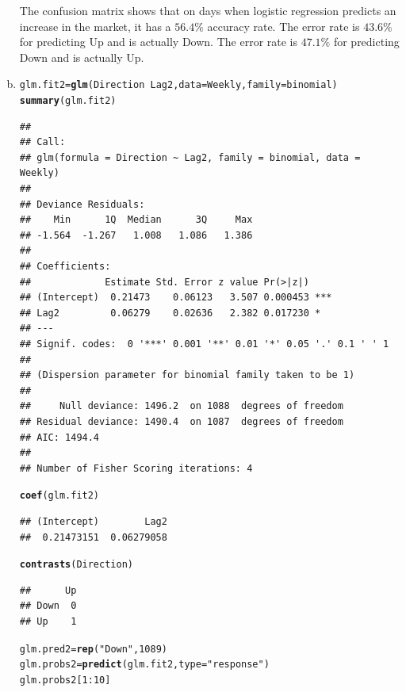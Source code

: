 \documentclass{article}\usepackage[]{graphicx}\usepackage[]{color}
\makeatletter
\newcommand{\hlnum}[1]{\textcolor[rgb]{0.686,0.059,0.569}{#1}}%
\newcommand{\hlstr}[1]{\textcolor[rgb]{0.192,0.494,0.8}{#1}}%
\newcommand{\hlopt}[1]{\textcolor[rgb]{0,0,0}{#1}}%
\newcommand{\hlstd}[1]{\textcolor[rgb]{0.345,0.345,0.345}{#1}}%
\newcommand{\hlkwb}[1]{\textcolor[rgb]{0.69,0.353,0.396}{#1}}%
\newcommand{\hlkwc}[1]{\textcolor[rgb]{0.333,0.667,0.333}{#1}}%
\newcommand{\hlkwd}[1]{\textcolor[rgb]{0.737,0.353,0.396}{\textbf{#1}}}%
\newenvironment{kframe}{%
 \def\at@end@of@kframe{}%
 \ifinner\ifhmode%
  \def\at@end@of@kframe{\end{minipage}}%
  \begin{minipage}{\columnwidth}%
 \fi\fi%
 \def\FrameCommand##1{\hskip\@totalleftmargin \hskip-\fboxsep
 \colorbox{shadecolor}{##1}\hskip-\fboxsep
     \hskip-\linewidth \hskip-\@totalleftmargin \hskip\columnwidth}%
 \MakeFramed {\advance\hsize-\width
   \@totalleftmargin\z@ \linewidth\hsize
   \@setminipage}}%
 {\par\unskip\endMakeFramed%
 \at@end@of@kframe}
\newenvironment{knitrout}{}{} %
\makeatother
\begin{document}
\begin{enumerate}[(a)]
The confusion matrix shows that on days when logistic regression predicts an increase in the market, it has a $56.4\%$ accuracy rate. The error rate is $43.6\%$ for predicting Up and is actually Down. The error rate is $47.1\%$ for predicting Down and is actually Up.

\item
\begin{knitrout}
\color{fgcolor}\begin{kframe}
\begin{alltt}
\hlstd{glm.fit2}\hlkwb{=}\hlkwd{glm}\hlstd{(Direction}\hlopt{~}\hlstd{Lag2,}\hlkwc{data}\hlstd{=Weekly,} \hlkwc{family} \hlstd{= binomial)}
\hlkwd{summary}\hlstd{(glm.fit2)}
\end{alltt}
\begin{verbatim}
## 
## Call:
## glm(formula = Direction ~ Lag2, family = binomial, data = Weekly)
## 
## Deviance Residuals: 
##    Min      1Q  Median      3Q     Max  
## -1.564  -1.267   1.008   1.086   1.386  
## 
## Coefficients:
##             Estimate Std. Error z value Pr(>|z|)    
## (Intercept)  0.21473    0.06123   3.507 0.000453 ***
## Lag2         0.06279    0.02636   2.382 0.017230 *  
## ---
## Signif. codes:  0 '***' 0.001 '**' 0.01 '*' 0.05 '.' 0.1 ' ' 1
## 
## (Dispersion parameter for binomial family taken to be 1)
## 
##     Null deviance: 1496.2  on 1088  degrees of freedom
## Residual deviance: 1490.4  on 1087  degrees of freedom
## AIC: 1494.4
## 
## Number of Fisher Scoring iterations: 4
\end{verbatim}
\begin{alltt}
\hlkwd{coef}\hlstd{(glm.fit2)}
\end{alltt}
\begin{verbatim}
## (Intercept)        Lag2 
##  0.21473151  0.06279058
\end{verbatim}
\begin{alltt}
\hlkwd{contrasts}\hlstd{(Direction)}
\end{alltt}
\begin{verbatim}
##      Up
## Down  0
## Up    1
\end{verbatim}
\begin{alltt}
\hlstd{glm.pred2}\hlkwb{=}\hlkwd{rep}\hlstd{(}\hlstr{"Down"}\hlstd{,} \hlnum{1089}\hlstd{)}
\hlstd{glm.probs2}\hlkwb{=}\hlkwd{predict}\hlstd{(glm.fit2,}\hlkwc{type}\hlstd{=}\hlstr{"response"}\hlstd{)}
\hlstd{glm.probs2[}\hlnum{1}\hlopt{:}\hlnum{10}\hlstd{]}
\end{alltt}
\begin{verbatim}

\end{verbatim}
\end{kframe}
\end{knitrout}
\end{enumerate}
\end{document}
